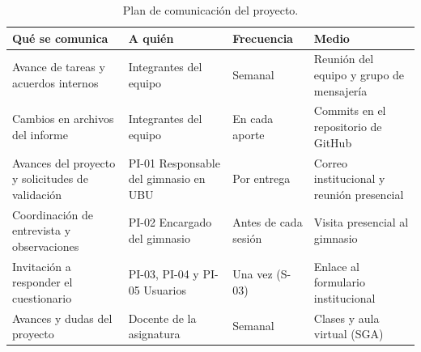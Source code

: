 \begin{table}[H]
  \centering\small
  \caption{Plan de comunicación del proyecto.}\label{tab:comunicacion}
  \renewcommand{\arraystretch}{1.3}
  \begin{tabularx}{\textwidth}{@{}LLlL@{}}
    \toprule
    Qué se comunica & A quién & Frecuencia & Medio \\
    \midrule
    Avance de tareas y acuerdos internos & Integrantes del equipo & Semanal & Reunión del equipo y grupo de mensajería \\
    Cambios en archivos del informe & Integrantes del equipo & En cada aporte & Commits en el repositorio de GitHub \\
    Avances del proyecto y solicitudes de validación & PI-01 Responsable del gimnasio en UBU & Por entrega & Correo institucional y reunión presencial \\
    Coordinación de entrevista y observaciones & PI-02 Encargado del gimnasio & Antes de cada sesión & Visita presencial al gimnasio \\
    Invitación a responder el cuestionario & PI-03, PI-04 y PI-05 Usuarios & Una vez (S-03) & Enlace al formulario institucional \\
    Avances y dudas del proyecto & Docente de la asignatura & Semanal & Clases y aula virtual (SGA) \\
    \bottomrule
  \end{tabularx}
\end{table}
